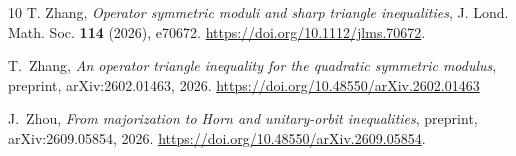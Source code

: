 \documentclass[11pt]{amsart}
\numberwithin{equation}{section}
\begin{document}
\begin{thebibliography}{10}
T. Zhang,
\emph{Operator symmetric moduli and sharp triangle inequalities},
J. Lond. Math. Soc. \textbf{114} (2026), e70672.
\url{https://doi.org/10.1112/jlms.70672}.

T.~Zhang,
\emph{An operator triangle inequality for the quadratic symmetric modulus},
preprint, arXiv:2602.01463, 2026.
\url{https://doi.org/10.48550/arXiv.2602.01463}


J.~Zhou,
\emph{From majorization to Horn and unitary-orbit inequalities},
preprint, arXiv:2609.05854, 2026.
\url{https://doi.org/10.48550/arXiv.2609.05854}.


\end{thebibliography}
\end{document}
